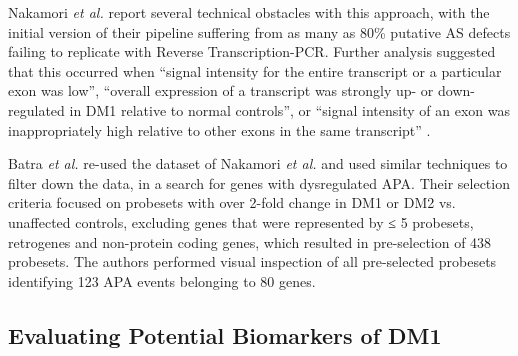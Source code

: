 \documentclass[10pt,letterpaper]{article}
\begin{document}
Nakamori {\it et al.} report several technical obstacles with this approach, with the initial version of their pipeline suffering from as many as 80\% putative AS defects failing to replicate with Reverse Transcription-PCR. Further analysis suggested that this occurred when \enquote{signal intensity for the entire transcript or a particular exon was low}, \enquote{overall expression of a transcript was strongly up- or down- regulated in DM1 relative to normal controls}, or \enquote{signal intensity of an exon was inappropriately high relative to other exons in the same transcript} \cite{Nakamori2013}.

Batra {\it et al.} \cite{Batra2014} re-used the dataset of Nakamori {\it et al.} \cite{Nakamori2013} and used similar techniques to filter down the data, in a search for genes with dysregulated APA. Their selection criteria focused on probesets with over 2-fold change in DM1 or DM2 vs. unaffected controls, excluding genes that were represented by ≤ 5 probesets, retrogenes and non-protein coding genes, which resulted in pre-selection of 438 probesets. The authors performed visual inspection of all pre-selected probesets identifying 123 APA events belonging to 80 genes.






\subsection*{Evaluating Potential Biomarkers of DM1}
\end{document}
